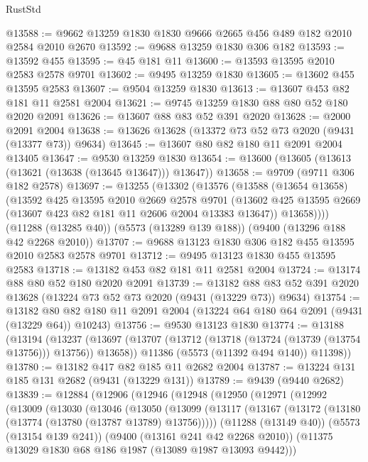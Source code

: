 \begin{lexlean}{RustStd}
\begin{coremodule}
@13588 := @9662 @13259 @1830 @1830 @9666 @2665 @456 @489 @182 @2010 @2584 @2010 @2670
@13592 := @9688 @13259 @1830 @306 @182
@13593 := @13592 @455
@13595 := @45 @181 @11
@13600 := @13593 @13595 @2010 @2583 @2578 @9701
@13602 := @9495 @13259 @1830
@13605 := @13602 @455 @13595 @2583
@13607 := @9504 @13259 @1830
@13613 := @13607 @453 @82 @181 @11 @2581 @2004
@13621 := @9745 @13259 @1830 @88 @80 @52 @180 @2020 @2091
@13626 := @13607 @88 @83 @52 @391 @2020
@13628 := @2000 @2091 @2004
@13638 := @13626 @13628 (@13372 @73 @52 @73 @2020 (@9431 (@13377 @73)) @9634)
@13645 := @13607 @80 @82 @180 @11 @2091 @2004 @13405
@13647 := @9530 @13259 @1830
@13654 := @13600 (@13605 (@13613 (@13621 (@13638 (@13645 @13647))) @13647))
@13658 := @9709 (@9711 @306 @182 @2578)
@13697 := @13255
    (@13302
      (@13576
        (@13588
          (@13654 @13658)
          (@13592
            @425
            @13595
            @2010
            @2669
            @2578
            @9701
            (@13602 @425 @13595 @2669 (@13607 @423 @82 @181 @11 @2606 @2004 @13383 @13647))
            @13658))))
    (@11288 (@13285 @40))
    (@5573 (@13289 @139 @188))
    (@9400 (@13296 @188 @42 @2268 @2010))
@13707 := @9688 @13123 @1830 @306 @182 @455 @13595 @2010 @2583 @2578 @9701
@13712 := @9495 @13123 @1830 @455 @13595 @2583
@13718 := @13182 @453 @82 @181 @11 @2581 @2004
@13724 := @13174 @88 @80 @52 @180 @2020 @2091
@13739 := @13182 @88 @83 @52 @391 @2020 @13628 (@13224 @73 @52 @73 @2020 (@9431 (@13229 @73)) @9634)
@13754 := @13182
    @80
    @82
    @180
    @11
    @2091
    @2004
    (@13224 @64 @180 @64 @2091 (@9431 (@13229 @64)) @10243)
@13756 := @9530 @13123 @1830
@13774 := @13188
    (@13194
      (@13237
        (@13697 (@13707 (@13712 (@13718 (@13724 (@13739 (@13754 @13756))) @13756)) @13658))
        @11386
        (@5573 (@11392 @494 @140))
        @11398))
@13780 := @13182 @417 @82 @185 @11 @2682 @2004
@13787 := @13224 @131 @185 @131 @2682 (@9431 (@13229 @131))
@13789 := @9439 (@9440 @2682)
@13839 := @12884
    (@12906
      (@12946
        (@12948
          (@12950
            (@12971
              (@12992
                (@13009
                  (@13030
                    (@13046
                      (@13050
                        (@13099
                          (@13117
                            (@13167 (@13172 (@13180 (@13774 (@13780 (@13787 @13789) @13756)))))
                            (@11288 (@13149 @40))
                            (@5573 (@13154 @139 @241))
                            (@9400 (@13161 @241 @42 @2268 @2010))
                            (@11375 @13029 @1830 @68 @186 @1987 (@13089 @1987 @13093 @9442)))

\end{coremodule}
\end{lexlean}
